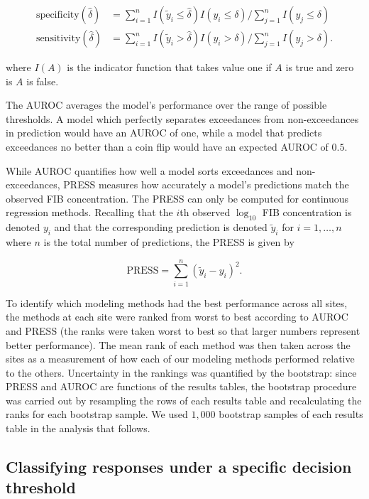 \documentclass[authoryear,review, 12pt]{elsarticle}
\begin{document}
\begin{align*}
\text{specificity}(\hat{\delta}) &= \sum_{i=1}^n I(\tilde{y}_i \le \hat{\delta}) I(y_i \le \delta) / \sum_{j=1}^n I(y_j \le \delta) \\
\text{sensitivity}(\hat{\delta}) &= \sum_{i=1}^n I(\tilde{y}_i > \hat{\delta}) I(y_i > \delta) / \sum_{j=1}^n I(y_j > \delta).
\end{align*}

where \(I(A)\) is the indicator function that takes value one if \(A\)
is true and zero is \(A\) is false.

The AUROC averages the model's performance over the range of possible
thresholds. A model which perfectly separates exceedances from
non-exceedances in prediction would have an AUROC of one, while a model
that predicts exceedances no better than a coin flip would have an
expected AUROC of \(0.5\).

While AUROC quantifies how well a model sorts exceedances and
non-exceedances, PRESS measures how accurately a model's predictions
match the observed FIB concentration. The PRESS can only be computed for
continuous regression methods. Recalling that the \(i\)th observed
\(\log_{10}\) FIB concentration is denoted \(y_{i}\) and that the
corresponding prediction is denoted \(\tilde{y}_i\) for \(i=1,\dots,n\)
where \(n\) is the total number of predictions, the PRESS is given by

\[\text{PRESS}=\sum_{i=1}^{n}\left(\tilde{y}_{i}-y_{i}\right)^{2}.\]

To identify which modeling methods had the best performance across all
sites, the methods at each site were ranked from worst to best according
to AUROC and PRESS (the ranks were taken worst to best so that larger
numbers represent better performance). The mean rank of each method was
then taken across the sites as a measurement of how each of our modeling
methods performed relative to the others. Uncertainty in the rankings
was quantified by the bootstrap: since PRESS and AUROC are functions of
the results tables, the bootstrap procedure was carried out by
resampling the rows of each results table and recalculating the ranks
for each bootstrap sample. We used \(1,000\) bootstrap samples of each
results table in the analysis that follows.

\subsection{Classifying responses under a specific decision
threshold}\label{section:threshold}
\end{document}
